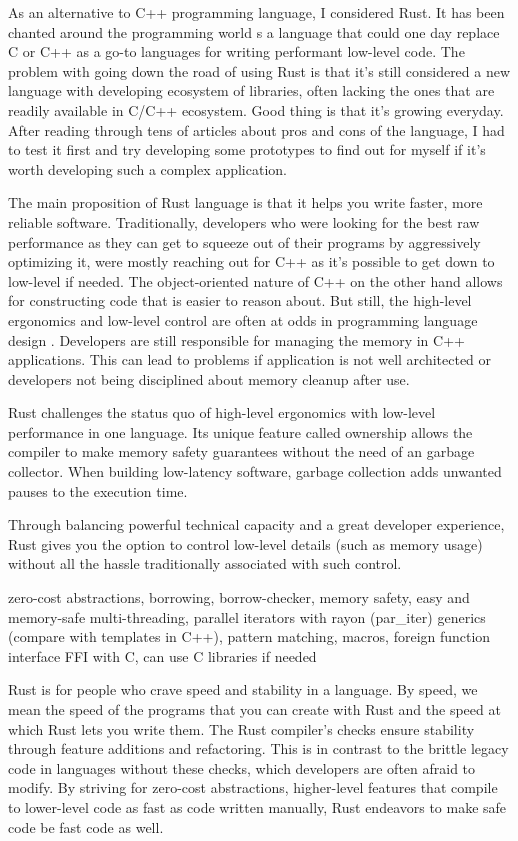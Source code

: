  As an alternative to C++ programming language, I considered Rust. It has been chanted around the programming world s a language that could one day replace C or C++ as a go-to languages for writing performant low-level code. The problem with going down the road of using Rust is that it's still considered a new language with developing ecosystem of libraries, often lacking the ones that are readily available in C/C++ ecosystem. Good thing is that it's growing everyday. After reading through tens of articles about pros and cons of the language, I had to test it first and try developing some prototypes to find out for myself if it's worth developing such a complex application.

The main proposition of Rust language is that it helps you write faster, more reliable software. Traditionally, developers who were looking for the best raw performance as they can get to squeeze out of their programs by aggressively optimizing it, were mostly reaching out for C++ as it's possible to get down to low-level if needed. The object-oriented nature of C++ on the other hand allows for constructing code that is easier to reason about. But still, the high-level ergonomics and low-level control are often at odds in programming language design \cite{steveklabnik2018}. Developers are still responsible for managing the memory in C++ applications. This can lead to problems if application is not well architected or developers not being disciplined about memory cleanup after use.

Rust challenges the status quo of high-level ergonomics with low-level performance in one language. Its unique feature called ownership allows the compiler to make memory safety guarantees without the need of an garbage collector. When building low-latency software, garbage collection adds unwanted pauses to the execution time. 

Through balancing powerful technical capacity and a great developer experience, Rust gives you the option to control low-level details (such as memory usage) without all the hassle traditionally associated with such control. \cite{steveklabnik2018}

zero-cost abstractions, borrowing, borrow-checker, memory safety, easy and memory-safe multi-threading, parallel iterators with rayon (par\_iter) generics (compare with templates in C++), pattern matching, macros, foreign function interface FFI with C, can use C libraries if needed


Rust is for people who crave speed and stability in a language. By speed, we mean the speed of the programs that you can create with Rust and the speed at which Rust lets you write them. The Rust compiler’s checks ensure stability through feature additions and refactoring. This is in contrast to the brittle legacy code in languages without these checks, which developers are often afraid to modify. By striving for zero-cost abstractions, higher-level features that compile to lower-level code as fast as code written manually, Rust endeavors to make safe code be fast code as well. \cite{steveklabnik2018}

